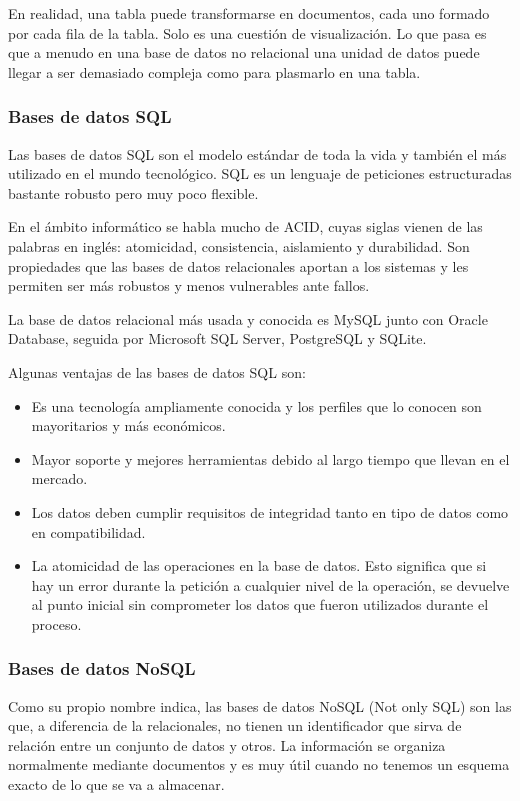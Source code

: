 En realidad, una tabla puede transformarse en documentos, cada uno formado por cada fila de la tabla. Solo es una cuestión de visualización. Lo que pasa es que a menudo en una base de datos no relacional una unidad de datos puede llegar a ser demasiado compleja como para plasmarlo en una tabla.

\subsubsection{Bases de datos SQL}

Las bases de datos SQL son el modelo estándar de toda la vida y también el más utilizado en el mundo tecnológico. SQL es un lenguaje de peticiones estructuradas bastante robusto pero muy poco flexible.

En el ámbito informático se habla mucho de ACID, cuyas siglas vienen de las palabras en inglés: atomicidad, consistencia, aislamiento y durabilidad. Son propiedades que las bases de datos relacionales aportan a los sistemas y les permiten ser más robustos y menos vulnerables ante fallos.

La base de datos relacional más usada y conocida es MySQL junto con Oracle Database, seguida por Microsoft SQL Server, PostgreSQL y SQLite.

Algunas ventajas de las bases de datos SQL son:

\begin{itemize}
  \item Es una tecnología ampliamente conocida y los perfiles que lo conocen son mayoritarios y más económicos.
  \item Mayor soporte y mejores herramientas debido al largo tiempo que llevan en el mercado.
  \item Los datos deben cumplir requisitos de integridad tanto en tipo de datos como en compatibilidad.
  \item La atomicidad de las operaciones en la base de datos. Esto significa que si hay un error durante la petición a cualquier nivel de la operación, se devuelve al punto inicial sin comprometer los datos que fueron utilizados durante el proceso.
\end{itemize}

\subsubsection{Bases de datos NoSQL}

Como su propio nombre indica, las bases de datos NoSQL (Not only SQL) son las que, a diferencia de la relacionales, no tienen un identificador que sirva de relación entre un conjunto de datos y otros. La información se organiza normalmente mediante documentos y es muy útil cuando no tenemos un esquema exacto de lo que se va a almacenar.

